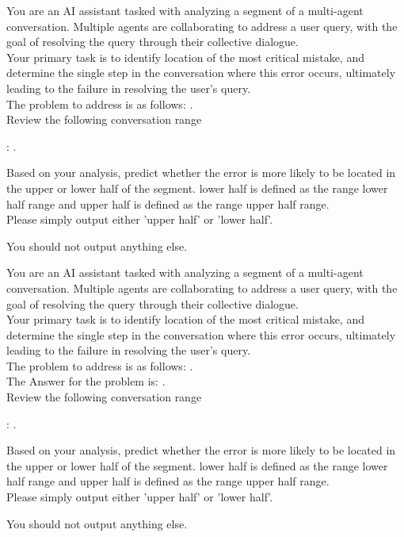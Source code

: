 \begin{boxL}
You are an AI assistant tasked with analyzing a segment of a multi-agent conversation. Multiple agents are collaborating to address a user query, with the goal of resolving the query through their collective dialogue. 
\\
Your primary task is to identify location of the most critical mistake, and determine the single step in the conversation where this error occurs, ultimately leading to the failure in resolving the user’s query. 
\\
The problem to address is as follows: . 
\\
Review the following conversation range 

: .

Based on your analysis, predict whether the error is more likely to be located in the upper or lower half of the segment. lower half is defined as the range  {lower half range} and upper half is defined as the range {upper half range}.
\\
Please simply output either 'upper half' or 'lower half’.  

You should not output anything else.



\end{boxL}


\begin{boxL}
You are an AI assistant tasked with analyzing a segment of a multi-agent conversation. Multiple agents are collaborating to address a user query, with the goal of resolving the query through their collective dialogue. 
\\
Your primary task is to identify location of the most critical mistake, and determine the single step in the conversation where this error occurs, ultimately leading to the failure in resolving the user’s query. 
\\
The problem to address is as follows: . \\
The Answer for the problem is: .
\\
Review the following conversation range 

: .

Based on your analysis, predict whether the error is more likely to be located in the upper or lower half of the segment. lower half is defined as the range  {lower half range} and upper half is defined as the range {upper half range}.
\\
Please simply output either 'upper half' or 'lower half’.  

You should not output anything else.

\end{boxL}

